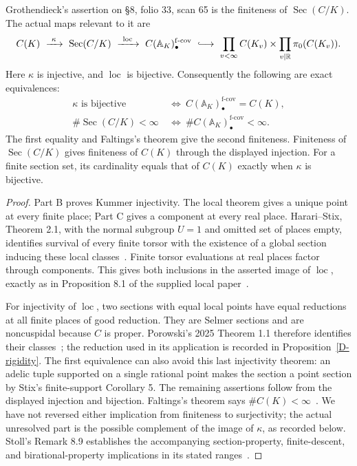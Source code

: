 \begin{proposition}
\label{D-logical}
Grothendieck's assertion on \S8, folio 33, scan 65 is
the finiteness of $\operatorname{Sec}(C/K)$.
The actual maps relevant to it are
\[
 C(K)\ \xrightarrow{\ \kappa\ }\ \operatorname{Sec}(C/K)
 \ \xrightarrow{\ \operatorname{loc}\ }\
 C(\mathbb A_K)_\bullet^{\mathrm{f\text{-}cov}}
 \ \lhook\joinrel\longrightarrow\
 \prod_{v<\infty}C(K_v)\times
 \prod_{v\mid\mathbb R}\pi_0(C(K_v)).
\]
Here $\kappa$ is injective, and $\operatorname{loc}$
is bijective. Consequently the following are exact
equivalences:
\[
 \begin{split}
 \kappa\text{ is bijective}
 &\ \Longleftrightarrow\
 C(\mathbb A_K)_\bullet^{\mathrm{f\text{-}cov}}=C(K),\\
 \#\operatorname{Sec}(C/K)<\infty
 &\ \Longleftrightarrow\
 \#C(\mathbb A_K)_\bullet^{\mathrm{f\text{-}cov}}<\infty.
 \end{split}
\]
The first equality and Faltings's theorem give the second
finiteness. Finiteness of $\operatorname{Sec}(C/K)$ gives
finiteness of $C(K)$ through the displayed injection.
For a finite section set, its cardinality equals that
of $C(K)$ exactly when $\kappa$ is bijective.
\end{proposition}
\begin{proof}
Part B proves Kummer injectivity. The local theorem gives
a unique point at every finite place; Part C gives a
component at every real place. Harari--Stix, Theorem 2.1,
with the normal subgroup $U=1$ and omitted set of places
empty, identifies survival of every finite torsor with
the existence of a global section inducing these local
classes~\cite{HarariStix2012}. Finite torsor evaluations
at real places factor through components. This gives
both inclusions in the asserted image of $\operatorname{loc}$,
exactly as in Proposition 8.1 of the supplied local
paper~\cite{B_OpenAIPadic}.

For injectivity of $\operatorname{loc}$, two sections
with equal local points have equal reductions at all
finite places of good reduction. They are Selmer
sections and are noncuspidal because $C$ is proper.
Porowski's 2025 Theorem 1.1 therefore identifies their
classes~\cite{Porowski2025}; the reduction used in its
application is recorded in Proposition~\ref{D-rigidity}.
The first equivalence can also avoid this last
injectivity theorem: an adelic tuple supported on a
single rational point makes the section a point
section by Stix's finite-support Corollary 5.
The remaining assertions follow from the displayed
injection and bijection. Faltings's theorem says
$\#C(K)<\infty$~\cite{Faltings1983}. We have not reversed
either implication from finiteness to surjectivity;
the actual unresolved part is the possible complement
of the image of $\kappa$, as recorded below.
Stoll's Remark 8.9 establishes the accompanying
section-property, finite-descent, and birational-property
implications in its stated ranges~\cite{Stoll2007}.
\end{proof}



